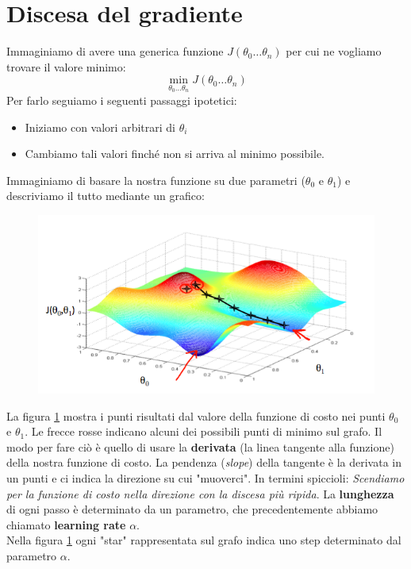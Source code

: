 \section{Discesa del gradiente}
Immaginiamo di avere una generica funzione $J(\theta_0 \dots \theta_n)$ per cui ne vogliamo trovare il valore minimo:
\[\min_{\theta_0 \dots \theta_n} J(\theta_0 \dots \theta_n)\]
Per farlo seguiamo i seguenti passaggi ipotetici:
\begin{itemize}
    \item Iniziamo con valori arbitrari di $\theta_i$
    \item Cambiamo tali valori finché non si arriva al minimo possibile.
\end{itemize}
Immaginiamo di basare la nostra funzione su due parametri ($\theta_0$ e $\theta_1$) e descriviamo il tutto mediante un grafico:
\begin{figure}[h!]
    \centering
    \includegraphics[width=1\textwidth]{img/bn9SyaDIEeav5QpTGIv-Pg_0d06dca3d225f3de8b5a4a7e92254153_Screenshot-2016-11-01-23.48.26.png}
    \caption{}\label{GradientDescent1}
\end{figure}
La figura \ref{GradientDescent1} mostra i punti risultati dal valore della funzione di costo nei punti $\theta_0$ e $\theta_1$. Le frecce rosse indicano alcuni dei possibili punti di minimo sul grafo. Il modo per fare ciò è quello di usare la \textbf{derivata} (la linea tangente alla funzione) della nostra funzione di costo. La pendenza (\textit{slope}) della tangente è la derivata in un punti e ci indica la direzione su cui "muoverci". In termini spiccioli: \textit{Scendiamo per la funzione di costo nella direzione con la discesa più ripida}. La \textbf{lunghezza} di ogni passo è determinato da un parametro, che precedentemente abbiamo chiamato \textbf{learning rate} $\alpha$. \\ Nella figura \ref{GradientDescent1} ogni "star" rappresentata sul grafo indica uno step determinato dal parametro $\alpha$. 
